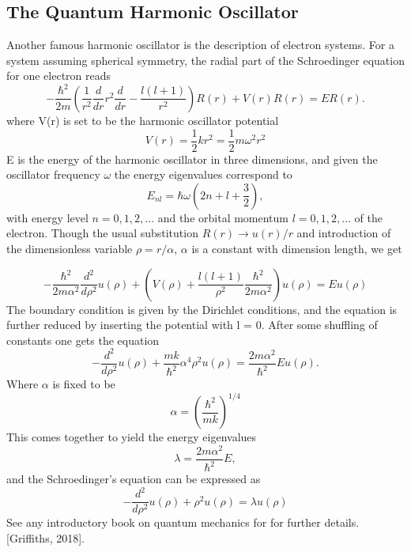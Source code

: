 \documentclass[%
reprint,
amsmath,amssymb,
aps,
]{revtex4-1}
\begin{document}
\subsection{The Quantum Harmonic Oscillator} \noindent 
Another famous harmonic oscillator is the description of electron systems. For a system assuming spherical symmetry, the radial part of the Schroedinger equation for one electron reads
\begin{equation*}
-\frac{\hbar^2}{2 m} \left ( \frac{1}{r^2} \frac{d}{dr} r^2
\frac{d}{dr} - \frac{l (l + 1)}{r^2} \right )R(r) 
+ V(r) R(r) = E R(r).
\end{equation*}
where V(r) is set to be the harmonic oscillator potential 
\begin{equation*}
	V(r) = \dfrac{1}{2}kr^2 = \dfrac{1}{2}m\omega^2r^2
\end{equation*}
E is the energy of the harmonic oscillator in three dimensions, and given the oscillator frequency $\omega$ the energy eigenvalues correspond to 
\begin{equation*}
E_{nl}=  \hbar \omega \left(2n+l+\frac{3}{2}\right),
\end{equation*}
with energy level $n=0,1,2,\dots$ and the orbital momentum $l=0,1,2,\dots$ of the electron. Though the usual substitution $R(r) \rightarrow u(r)/r$ and introduction of the dimensionless variable $\rho = r/\alpha$, $\alpha$ is a constant with dimension length, we get

\begin{equation*}
-\frac{\hbar^2}{2 m \alpha^2} \frac{d^2}{d\rho^2} u(\rho) 
+ \left ( V(\rho) + \frac{l (l + 1)}{\rho^2}
\frac{\hbar^2}{2 m\alpha^2} \right ) u(\rho)  = E u(\rho)
\end{equation*}
The boundary condition is given by the Dirichlet conditions, and the equation is further reduced by inserting the potential with l = 0. After some shuffling of constants one gets the equation  
\begin{equation*}
-\frac{d^2}{d\rho^2} u(\rho) 
+ \frac{mk}{\hbar^2} \alpha^4\rho^2u(\rho)  = \frac{2m\alpha^2}{\hbar^2}E u(\rho) .
\end{equation*}
Where $\alpha$ is fixed to be 
\begin{equation*}
\alpha = \left(\frac{\hbar^2}{mk}\right)^{1/4}
\end{equation*}
This comes together to yield the energy eigenvalues 
\begin{equation*}
\lambda = \frac{2m\alpha^2}{\hbar^2}E,
\end{equation*}
and the Schroedinger's equation can be expressed as
\begin{equation}\label{qho}
-\frac{d^2}{d\rho^2} u(\rho) + \rho^2u(\rho)  = \lambda u(\rho)
\end{equation}
See any introductory book on quantum mechanics for for further details. [Griffiths, 2018]. 
\end{document}
